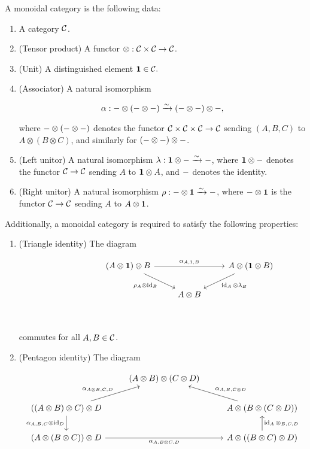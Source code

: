 \begin{defn} A monoidal category is the following data:

\begin{enumerate}
\item A category ${\mathcal C}$.
\item (Tensor product) A functor $\otimes: {\mathcal C} \times {\mathcal C} \to {\mathcal C}$.
\item (Unit) A distinguished element ${\mathbf 1}\in {\mathcal C}.$
\item (Associator) A natural isomorphism

$$\alpha: -\otimes (- \otimes -) \xrightarrow{\sim} (-\otimes -)\otimes - , $$

where $- \otimes (-\otimes -)$ denotes the functor ${\mathcal C}\times {\mathcal C}\times {\mathcal C}\to{\mathcal C}$ sending $(A,B,C)$ to $A\otimes (B\otimes C)$, and similarly for $(- \otimes - )\otimes-$.
\item (Left unitor) A natural isomorphism $\lambda: {\mathbf 1}\otimes - \xrightarrow{\sim} -$, where ${\mathbf 1}\otimes -$ denotes the functor ${\mathcal C}\to {\mathcal C}$ sending $A$ to ${\mathbf 1}\otimes A$, and $-$ denotes the identity.
\item (Right unitor) A natural isomorphism $\rho: -\otimes {\mathbf 1} \xrightarrow{\sim} -$, where $-\otimes {\mathbf 1}$ is the functor ${\mathcal C}\to {\mathcal C}$ sending $A$ to $A\otimes {\mathbf 1}$.
\end{enumerate}

Additionally, a monoidal category is required to satisfy the following properties:

\begin{enumerate}
\item (Triangle identity) The diagram

\[\begin{tikzcd}
	{} & {} & {\left(A\otimes \bone\right)\otimes B} & {} & {A\otimes (\bone\otimes B)} \\
	&& {} & {A\otimes B} \\
	&&&& {}
	\arrow["{\alpha_{A,1,B}}", from=1-3, to=1-5]
	\arrow["{\rho_A\otimes \id_B}"', from=1-3, to=2-4]
	\arrow["{\id_A\otimes \lambda_B}", from=1-5, to=2-4]
\end{tikzcd}\]

commutes for all $A,B\in {\mathcal C}$.

\item (Pentagon identity) The diagram

\[\begin{tikzcd}
	& {(A\otimes B)\otimes(C\otimes D)} \\
	{((A\otimes B)\otimes C)\otimes D} && {A\otimes (B\otimes (C\otimes D))} \\
	{(A\otimes (B\otimes C))\otimes D} && {A\otimes((B\otimes C)\otimes D)}
	\arrow["{\alpha_{A\otimes B, C,D}}", from=2-1, to=1-2]
	\arrow["{\alpha_{A,B,{C\otimes D}}}"', from=2-3, to=1-2]
	\arrow["{\alpha_{A,B,C}\otimes \id_D}"', from=2-1, to=3-1]
	\arrow["{\id_A\otimes_{B,C,D}}"', from=3-3, to=2-3]
	\arrow["{\alpha_{A,B\otimes C,D}}"', from=3-1, to=3-3]
\end{tikzcd}\]


\end{enumerate}
\end{defn}
